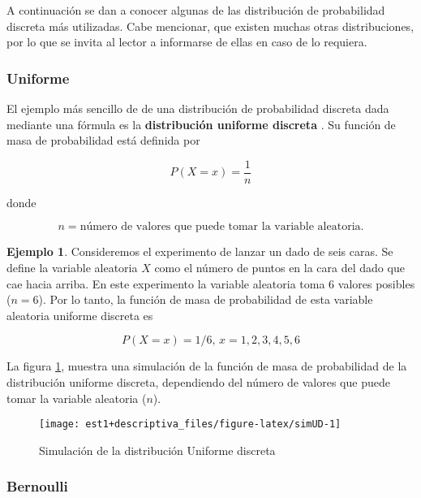 \documentclass[
]{book}
\theoremstyle{definition}
\theoremstyle{definition}
\newtheorem{example}{Ejemplo}[chapter]
\theoremstyle{definition}
\theoremstyle{definition}
\theoremstyle{remark}
\begin{document}
A continuación se dan a conocer algunas de las distribución de probabilidad discreta más utilizadas. Cabe mencionar, que existen muchas otras distribuciones, por lo que se invita al lector a informarse de ellas en caso de lo requiera.

\hypertarget{uniforme}{%
\subsubsection*{Uniforme}\label{uniforme}}

El ejemplo más sencillo de de una distribución de probabilidad discreta dada mediante una fórmula es la \textbf{distribución uniforme discreta} \citep[página 191]{anderson}. Su función de masa de probabilidad está definida por

\begin{equation}
P(X=x) = \dfrac{1}{n}
\label{eq:uniformediscreta}
\end{equation}

donde

\[n = \text{número de valores que puede tomar la variable aleatoria.}\]

\begin{example}
Consideremos el experimento de lanzar un dado de seis caras. Se define la variable aleatoria \(X\) como el número de puntos en la cara del dado que cae hacia arriba. En este experimento la variable aleatoria toma 6 valores posibles (\(n = 6\)). Por lo tanto, la función de masa de probabilidad de esta variable aleatoria uniforme discreta es

\[P(X = x)=1/6 \text{, } x = 1,2,3,4,5,6\]
\end{example}

La figura \ref{fig:simUD}, muestra una simulación de la función de masa de probabilidad de la distribución uniforme discreta, dependiendo del número de valores que puede tomar la variable aleatoria (\(n\)).

\begin{figure}

{\centering \texttt{[image: est1+descriptiva\_files/figure-latex/simUD-1]} 

}

\caption{Simulación de la distribución Uniforme discreta}\label{fig:simUD}
\end{figure}

\hypertarget{bernoulli}{%
\subsubsection*{Bernoulli}\label{bernoulli}}
\end{document}
